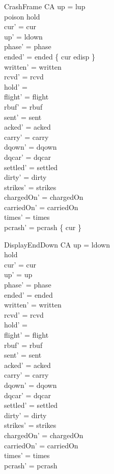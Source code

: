 \documentclass[a4paper,10pt,fleqn]{article}
\begin{document}
\begin{schema}{CrashFrame}
  \Delta CA
\where
  up = lup \\
  poison \in \dom hold \\
  cur' = cur \\
  up' = ldown \\
  phase' = phase \\
  ended' = ended \oplus \{ cur \mapsto edisp \} \\
  written' = written \\
  rcvd' = rcvd \\
  hold' = \emptyset \\
  flight' = flight \\
  rbuf' = rbuf \\
  sent' = sent \\
  acked' = acked \\
  carry' = carry \\
  dqown' = dqown \\
  dqcar' = dqcar \\
  settled' = settled \\
  dirty' = dirty \\
  strikes' = strikes \\
  chargedOn' = chargedOn \\
  carriedOn' = carriedOn \\
  times' = times \\
  pcrash' = pcrash \cup \{ cur \}
\end{schema}

\begin{schema}{DisplayEndDown}
  \Delta CA
\where
  up = ldown \\
  hold \neq \emptyset \\
  cur' = cur \\
  up' = up \\
  phase' = phase \\
  ended' = ended \\
  written' = written \\
  rcvd' = rcvd \\
  hold' = \emptyset \\
  flight' = flight \\
  rbuf' = rbuf \\
  sent' = sent \\
  acked' = acked \\
  carry' = carry \\
  dqown' = dqown \\
  dqcar' = dqcar \\
  settled' = settled \\
  dirty' = dirty \\
  strikes' = strikes \\
  chargedOn' = chargedOn \\
  carriedOn' = carriedOn \\
  times' = times \\
  pcrash' = pcrash
\end{schema}
\end{document}
